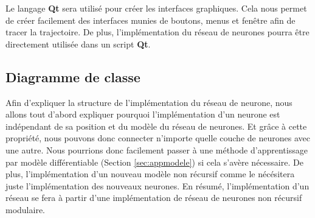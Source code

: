 \documentclass[12pt,a4paper,oneside, titlepage]{article}
\begin{document}
Le langage \textbf{Qt} sera utilisé pour créer les interfaces graphiques.
Cela nous permet de créer facilement des interfaces munies de boutons, menus et fenêtre afin de tracer la trajectoire.
De plus, l'implémentation du réseau de neurones pourra être directement utilisée dans un script \textbf{Qt}.

\subsection{Diagramme de classe}
Afin d'expliquer la structure de l'implémentation du réseau de neurone, nous allons tout d'abord expliquer pourquoi l'implémentation d'un neurone est indépendant de sa position et du modèle du réseau de neurones.
Et grâce à cette propriété, nous pouvons donc connecter n'importe quelle couche de neurones avec une autre.
Nous pourrions donc facilement passer à une méthode d'apprentissage par modèle différentiable (Section \ref{sec:appmodele}) si cela s'avère nécessaire.
De plus, l'implémentation d'un nouveau modèle non récursif comme le \mlp nécésitera juste l'implémentation des nouveaux neurones.
En résumé, l'implémentation d'un réseau \rbf se fera à partir d'une implémentation de réseau de neurones non récursif modulaire.\\
\end{document}
